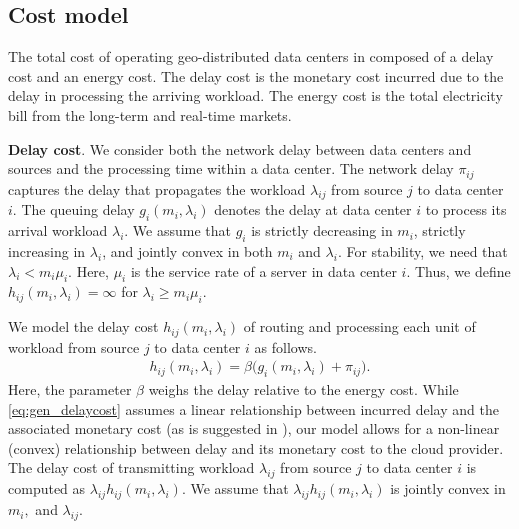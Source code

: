
\subsection{Cost model}

The total cost of operating geo-distributed data centers in composed of a delay cost and an energy cost. The delay cost is the monetary cost incurred due to the delay in processing the arriving workload. The energy cost is the total electricity bill from the long-term and real-time markets.


\textbf{Delay cost}. We consider both the network delay between data centers and sources and the processing time within a data center. The network delay $\pi_{ij}$ captures the delay that propagates the workload $\lambda_{ij}$ from source $j$ to data center $i$. The queuing delay  $g_i(m_i,\lambda_i)$ denotes the delay at data center $i$ to process its arrival workload $\lambda_i$. We assume that $g_i$ is strictly decreasing
in $m_i$, strictly increasing in $\lambda_i$, and jointly convex in both
$m_i$ and $\lambda_i$. For stability, we need that $\lambda_i < m_i \mu _i$.
Here, $\mu _i$ is the service rate of a server in data center $i$.
Thus, we define $h_{ij}(m_i, \lambda_{i}) = \infty$ for $\lambda_i \geq m_i \mu_i.$

We model the delay cost $h_{ij}(m_i,\lambda_i)$ of routing and processing each unit of workload from source $j$ to data center $i$ as follows.
\begin{eqnarray}
  \label{eq:gen_delaycost}  
  h_{ij}(m_i, \lambda_{i}) = \beta \big ( g_i(m_i,\lambda_i) + \pi_{ij}  \big ).
\end{eqnarray}
Here, the parameter $\beta$ weighs the delay
relative to the energy cost. While {\eqref{eq:gen_delaycost}} assumes a linear
relationship between incurred delay and the associated monetary cost
(as is suggested in {\cite{Beheshti2012PerformanceImpact}}), our model
allows for a non-linear (convex) relationship between delay and
its monetary cost to the cloud provider. The delay cost of transmitting workload {$\lambda_{ij}$} from source $j$ to data center {$i$} is computed as $\lambda_{ij}h_{ij}(m_i,\lambda_i)$. 
We assume that $\lambda_{ij}h_{ij}(m_i, \lambda_{i})$ is jointly convex in $m_i,$ and $\lambda_{ij}.$


